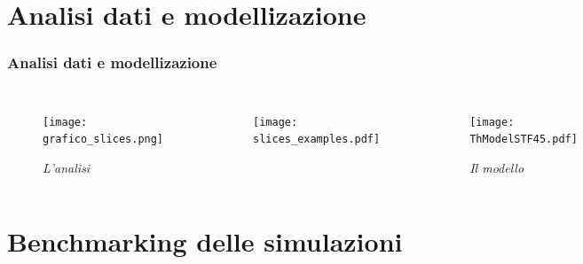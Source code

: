 \documentclass[10pt]{beamer}
\begin{document}
\section{Analisi dati e modellizazione} 

\begin{frame}
\frametitle{Analisi dati e modellizazione}
\begin{columns}[t] %

\vspace*{-1cm}
\begin{figure}
\caption{\footnotesize \itshape L'analisi}
\texttt{[image: grafico\_slices.png]}
\end{figure}\vspace{-0.8cm}
\begin{figure}
\texttt{[image: slices\_examples.pdf]}
\end{figure}\vspace{1cm}


\vspace*{-1cm}
\begin{figure}
\caption{ \footnotesize \itshape Il modello}
\texttt{[image: ThModelSTF45.pdf]}
\end{figure}\vspace{-0.8cm}
\begin{figure}
\texttt{[image: ThModelSTF45\_means.pdf]}
\end{figure}

\end{columns}
\end{frame}

\section{Benchmarking delle simulazioni} 
\end{document}
